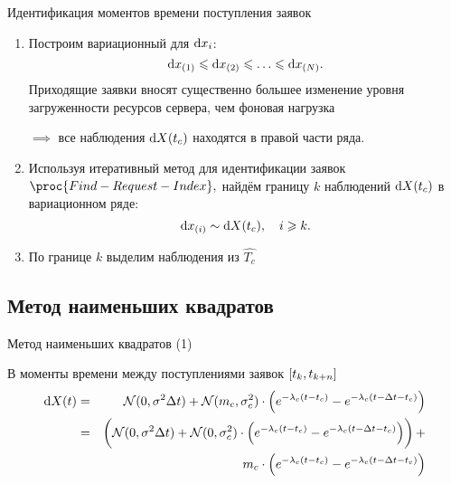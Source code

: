 \documentclass[utf8]{beamer}
\begin{document}
\begin{frame}{Идентификация моментов времени поступления заявок}
\begin{enumerate}
\item Построим вариационный для $\dif x_i$:
  $$\dif x_{(1)} \leqslant \dif x_{(2)} \leqslant \ldots 
    \leqslant \dif x_{(N)}.$$
  Приходящие заявки вносят существенно большее изменение уровня загруженности
  ресурсов сервера, чем фоновая нагрузка

  $\implies$ все наблюдения $\dif X(t_c)$ находятся в правой части ряда.

\item Используя итеративный метод для идентификации заявок 
$\proc{Find-Request-Index},$
найдём границу $k$ наблюдений $\dif X(t_c)$ в вариационном ряде:
$$
  \dif x_{(i)} \sim \dif X(t_c), \quad i \geqslant k.
$$

\item По границе $k$ выделим наблюдения из $\widehat{T_c}$
\end{enumerate}
\end{frame}


\subsection[МНК]{Метод наименьших квадратов}
\begin{frame}{Метод наименьших квадратов (1)}
\begin{block}{В моменты времени между поступлениями заявок $\sbr{t_k, t_{k+n}}$}
\begin{eqnarray*}
\dif X(t) 
  & = & \mathcal{N}(0, \sigma^2 \Delta t) + 
      \mathcal{N}(m_c, \sigma_c^2) \cdot 
        \del{e^{-\lambda_c(t - t_c)} - e^{-\lambda_c(t - \Delta t - t_c)}} \\
  & = & \del{
      \mathcal{N}(0, \sigma^2 \Delta t) + 
      \mathcal{N}(0, \sigma_c^2) \cdot 
        \del{e^{-\lambda_c(t - t_c)} - e^{-\lambda_c(t - \Delta t - t_c)}}} +\\
      && m_c \cdot 
        \del{e^{-\lambda_c(t - t_c)} - e^{-\lambda_c(t - \Delta t - t_c)}}
\end{eqnarray*}
\end{block}
\end{frame}
\end{document}
